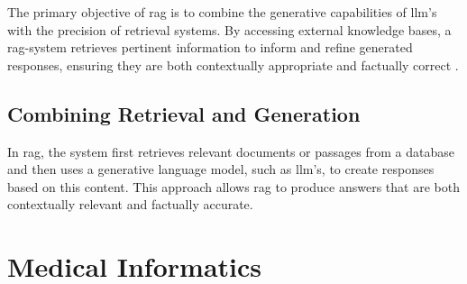 
The primary objective of \ac{rag} is to combine the generative capabilities of \ac{llm}'s with the precision of retrieval systems. 
By accessing external knowledge bases, a \ac{rag}-system retrieves pertinent information to inform and refine generated responses, ensuring they are both contextually appropriate and factually correct \citep{Lewis2020}.


\subsection{Combining Retrieval and Generation}\label{sec:combining-retrieval-generation}
In \ac{rag}, the system first retrieves relevant documents or passages from a database and then uses a generative language model, such as \ac{llm}'s, to create responses based on this content. 
This approach allows \ac{rag} to produce answers that are both contextually relevant and factually accurate.


\section{Medical Informatics}\label{sec:medical-informatics}

